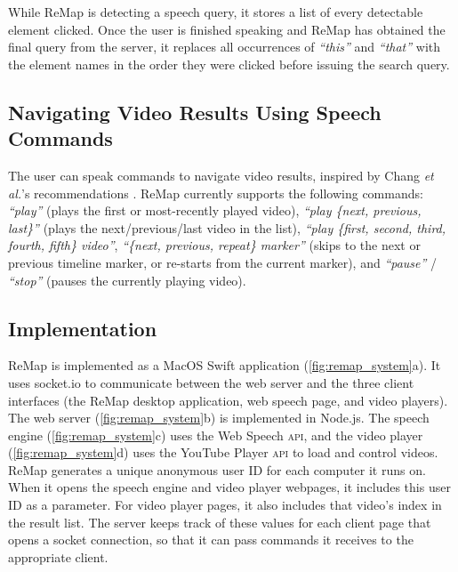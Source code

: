 While ReMap is detecting a speech query, it stores a list of every detectable element clicked. Once the user is finished speaking and ReMap has obtained the final query from the server, it replaces all occurrences of \textit{``this''} and \textit{``that''} with the element names in the order they were clicked before issuing the search query.

\subsection{Navigating Video Results Using Speech Commands}
The user can speak commands to navigate video results, inspired by Chang \textit{et al.}'s recommendations \cite{Chang2019}. ReMap currently supports the following commands: \textit{``play''} (plays the first or most-recently played video), \textit{``play \{next, previous, last\}''} (plays the next/previous/last video in the list), \textit{``play \{first, second, third, fourth, fifth\} video''}, \textit{``\{next, previous, repeat\} marker''} (skips to the next or previous timeline marker, or re-starts from the current marker), and \textit{``pause''} / \textit{``stop''} (pauses the currently playing video).


\subsection{Implementation}
ReMap is implemented as a MacOS Swift application (\autoref{fig:remap_system}a). It uses socket.io to communicate between the web server and the three client interfaces (the ReMap desktop application, web speech page, and video players). The web server (\autoref{fig:remap_system}b) is implemented in Node.js. The speech engine (\autoref{fig:remap_system}c) uses the Web Speech \textsc{api}, and the video player (\autoref{fig:remap_system}d) uses the YouTube Player \textsc{api} to load and control videos. ReMap generates a unique anonymous user ID for each computer it runs on. When it opens the speech engine and video player webpages, it includes this user ID as a parameter. For video player pages, it also includes that video's index in the result list. The server keeps track of these values for each client page that opens a socket connection, so that it can pass commands it receives to the appropriate client.

